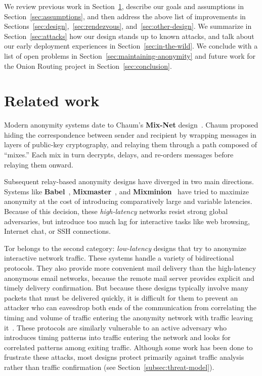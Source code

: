 \documentclass[twocolumn]{article}
\begin{document}
We review previous work in Section~\ref{sec:related-work}, describe
our goals and assumptions in Section~\ref{sec:assumptions},
and then address the above list of improvements in
Sections~\ref{sec:design},~\ref{sec:rendezvous}, and~\ref{sec:other-design}.
We summarize
in Section~\ref{sec:attacks} how our design stands up to
known attacks, and talk about our early deployment experiences in
Section~\ref{sec:in-the-wild}. We conclude with a list of open problems in
Section~\ref{sec:maintaining-anonymity} and future work for the Onion
Routing project in Section~\ref{sec:conclusion}.


\section{Related work}
\label{sec:related-work}

Modern anonymity systems date to Chaum's {\bf Mix-Net}
design~\cite{chaum-mix}. Chaum
proposed hiding the correspondence between sender and recipient by
wrapping messages in layers of public-key cryptography, and relaying them
through a path composed of ``mixes.''  Each mix in turn
decrypts, delays, and re-orders messages before relaying them
onward.

Subsequent relay-based anonymity designs have diverged in two
main directions. Systems like {\bf Babel}~\cite{babel},
{\bf Mixmaster}~\cite{mixmaster-spec},
and {\bf Mixminion}~\cite{minion-design} have tried
to maximize anonymity at the cost of introducing comparatively large and
variable latencies. Because of this decision, these \emph{high-latency}
networks resist strong global adversaries,
but introduce too much lag for interactive tasks like web browsing,
Internet chat, or SSH connections.

Tor belongs to the second category: \emph{low-latency} designs that
try to anonymize interactive network traffic. These systems handle
a variety of bidirectional protocols. They also provide more convenient
mail delivery than the high-latency anonymous email
networks, because the remote mail server provides explicit and timely
delivery confirmation. But because these designs typically
involve many packets that must be delivered quickly, it is
difficult for them to prevent an attacker who can eavesdrop both ends of the
communication from correlating the timing and volume
of traffic entering the anonymity network with traffic leaving it~\cite{SS03}.
These
protocols are similarly vulnerable to an active adversary who introduces
timing patterns into traffic entering the network and looks
for correlated patterns among exiting traffic.
Although some work has been done to frustrate
these attacks, %
 most designs protect primarily against traffic analysis rather than traffic
confirmation (see Section~\ref{subsec:threat-model}).
\end{document}
